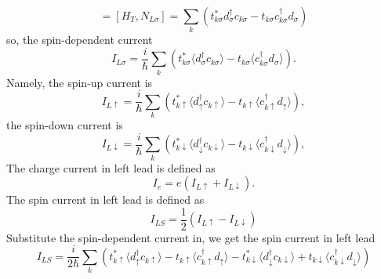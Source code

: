 \documentclass[11pt,a4paper]{article}
\begin{document}
\begin{equation}
[H, N_{L\sigma}] = [H_{T}, N_{L\sigma}] =  \sum_{k}\left(t_{k \sigma}^{*} d_{\sigma}^{\dagger} c_{k \sigma} - t_{k \sigma} c_{k \sigma}^{\dagger} d_{\sigma} \right)
\end{equation}
so, the spin-dependent current
\begin{equation}
I_{L\sigma} = \frac{i}{\hbar} \sum_{k} \left( t_{k \sigma}^{*} \langle  d_{\sigma}^{\dagger} c_{k \sigma}\rangle - t_{k \sigma} \langle c_{k \sigma}^{\dagger} d_{\sigma} \rangle \right).
\end{equation}
Namely, the spin-up current is
\begin{equation}
I_{L\uparrow} = \frac{i}{\hbar} \sum_{k} \left( t_{k \uparrow}^{*} \langle  d_{\uparrow}^{\dagger} c_{k \uparrow}\rangle - t_{k \uparrow} \langle c_{k \uparrow}^{\dagger} d_{\uparrow} \rangle \right),
\end{equation}
the spin-down current is
\begin{equation}
I_{L\downarrow} = \frac{i}{\hbar} \sum_{k} \left( t_{k \downarrow}^{*} \langle  d_{\downarrow}^{\dagger} c_{k \downarrow}\rangle - t_{k \downarrow} \langle c_{k \downarrow}^{\dagger} d_{\downarrow} \rangle \right),
\end{equation}
The charge current in left lead is defined as
\begin{equation}
I_{e} = e(I_{L\uparrow} + I_{L\downarrow}).
\end{equation}
The spin current in left lead is defined as
\begin{equation}
I_{LS} = \frac{1}{2}(I_{L\uparrow} - I_{L\downarrow})
\end{equation}
Substitute the spin-dependent current in, we get the spin current in left lead
\begin{equation}
I_{LS} = \frac{i}{2\hbar} \sum_{k} \left( t_{k \uparrow}^{*} \langle  d_{\uparrow}^{\dagger} c_{k \uparrow}\rangle - t_{k \uparrow} \langle c_{k \uparrow}^{\dagger} d_{\uparrow} \rangle -  t_{k \downarrow}^{*} \langle  d_{\downarrow}^{\dagger} c_{k \downarrow}\rangle + t_{k \downarrow} \langle c_{k \downarrow}^{\dagger} d_{\downarrow} \rangle \right)
\end{equation}
\end{document}
